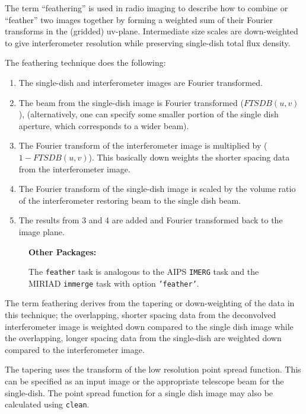 The term ``feathering'' is used in radio imaging to describe how to
combine or ``feather'' two images together by forming a weighted
sum of their Fourier transforms in the (gridded) uv-plane.
Intermediate size scales are down-weighted to give interferometer
resolution while preserving single-dish total flux density.

The feathering technique does the following:
\begin{enumerate}
\item The single-dish and interferometer images are Fourier
      transformed. 
    \item The beam from the single-dish image is Fourier transformed
      ($FTSDB(u,v)$), (alternatively, one can specify some smaller
      portion of the single dish aperture, which corresponds to a
      wider beam).
\item The Fourier transform of the interferometer image is multiplied
      by ($1-FTSDB(u,v)$).  This basically down weights the shorter
      spacing data from the interferometer image.
\item The Fourier transform of the single-dish image is scaled by the
      volume ratio of the interferometer restoring beam to the single
      dish beam.
\item The results from 3 and 4 are added and Fourier transformed
      back to the image plane.
\end{enumerate}

\begin{wrapfigure}{r}{2.5in}
  \begin{boxedminipage}{2.5in}
     \centerline{\bf Other Packages:}
     The {\tt feather} task is analogous to the AIPS {\tt IMERG} 
     task and the MIRIAD {\tt immerge} task with option 
     {\tt 'feather'}.
  \end{boxedminipage}
\end{wrapfigure}
The term feathering derives from the tapering or down-weighting of the
data in this technique; the overlapping, shorter spacing data from the
deconvolved interferometer image is weighted down compared to the
single dish image while the overlapping, longer spacing data from the
single-dish are weighted down compared to the interferometer image.

The tapering uses the transform of the low resolution point spread
function. This can be specified as an input image or the appropriate
telescope beam for the single-dish.  The point spread function for a
single dish image may also be calculated using {\tt clean}.

